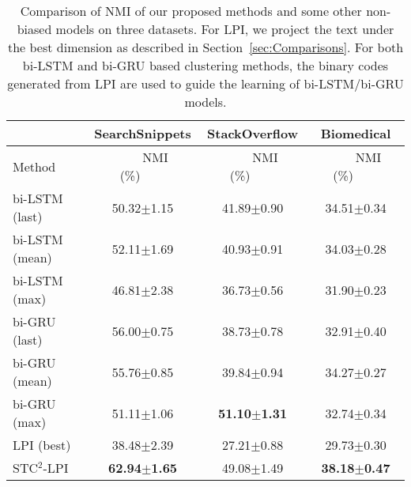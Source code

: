 \documentclass[review]{elsarticle}
\begin{document}
\begin{table*}[t] %
\begin{center}
\begin{tabular}{|l|c|c|c|}\hline
&SearchSnippets &StackOverflow &Biomedical\\\hline
Method      &~~~~NMI (\%)~~~~&~~~~NMI (\%)~~~~&~~~~NMI (\%)~~~~\\\hline \hline
bi-LSTM (last)& 50.32$\pm$1.15        & 41.89$\pm$0.90  & 34.51$\pm$0.34    \\
bi-LSTM (mean)& 52.11$\pm$1.69    & 40.93$\pm$0.91  & 34.03$\pm$0.28 \\
bi-LSTM (max) & 46.81$\pm$2.38     	&36.73$\pm$0.56	  &31.90$\pm$0.23\\
bi-GRU (last)& 56.00$\pm$0.75        & 38.73$\pm$0.78  & 32.91$\pm$0.40    \\
bi-GRU (mean)& 55.76$\pm$0.85    & 39.84$\pm$0.94  & 34.27$\pm$0.27 \\
bi-GRU (max) & 51.11$\pm$1.06     &	{\bf{51.10$\pm$1.31}}	  &32.74$\pm$0.34\\
\hline
LPI (best)&  38.48$\pm$2.39	& 27.21$\pm$0.88        &29.73$\pm$0.30\\
STC$^2$-LPI&	{\bf{62.94$\pm$1.65}}	& 49.08$\pm$1.49 &{\bf{38.18$\pm$0.47}}\\\hline

\end{tabular}
\end{center}
\caption{\label{tb:ComparisonNMI_BIRNN} Comparison of NMI of our proposed methods and some other non-biased models on three datasets. For LPI, we project the text under the best dimension as described in Section~\ref{sec:Comparisons}. For both bi-LSTM and bi-GRU based clustering methods, the binary codes generated from LPI are used to guide the learning of bi-LSTM/bi-GRU models.}
\end{table*}
\end{document}
